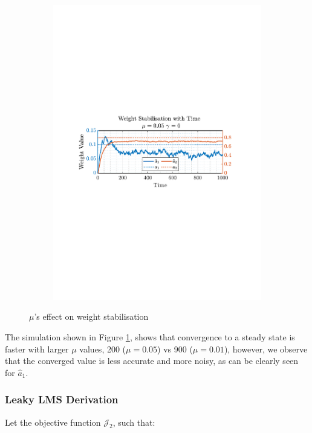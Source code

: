 \documentclass[12pt]{article}
\begin{document}
\begin{figure}[H]
\begin{subfigure}{0.49\textwidth}
					\includegraphics[trim={2.2cm 11.2cm 3.00cm  11.2cm}, clip, width
					=\textwidth]{../MATLAB/figures/q2_1cd_fig03.pdf} 
					\captionsetup{justification=centering}
				\end{subfigure}
				\captionsetup{justification=centering}
				\caption{$\mu$'s effect on weight stabilisation}
				\label{fig: 2-1d}
			\end{figure}
		The simulation shown in Figure \ref{fig: 2-1d}, shows that convergence to a steady state is faster with larger $\mu$ values, 200 ($\mu=0.05$) vs 900 ($\mu=0.01$), however, we observe that the converged value is less accurate and more noisy, as can be clearly seen for $\hat{a}_1$.
		\subsubsection{Leaky LMS Derivation}
			Let the objective function $\mathcal{J}_{2}$, such that:
			
\end{document}
